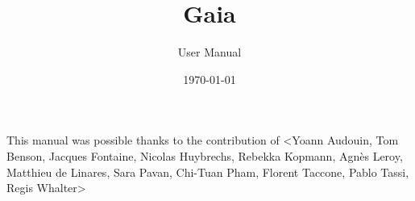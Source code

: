 \documentclass[Gaia]{../../data/TelemacDoc} %
\begin{document}
\let\cleardoublepage\clearpage

\setlength\parindent{0pt}

\title{Gaia}
\subtitle{User Manual}
\version{\telmaversion}
\author{}
\date{\today}
\maketitle
\clearpage



\newpage

\thispagestyle{empty}

\TelemacCopyright{}




\pagestyle{empty} %

\tableofcontents%


\pagestyle{fancy} %

\pagebreak
This manual was possible thanks to the contribution of <Yoann Audouin, Tom Benson, Jacques Fontaine, Nicolas Huybrechs, Rebekka Kopmann, Agn\`es Leroy, Matthieu de Linares, Sara Pavan, Chi-Tuan Pham,  Florent Taccone, Pablo Tassi, Regis Whalter>
\pagebreak



\end{document}
